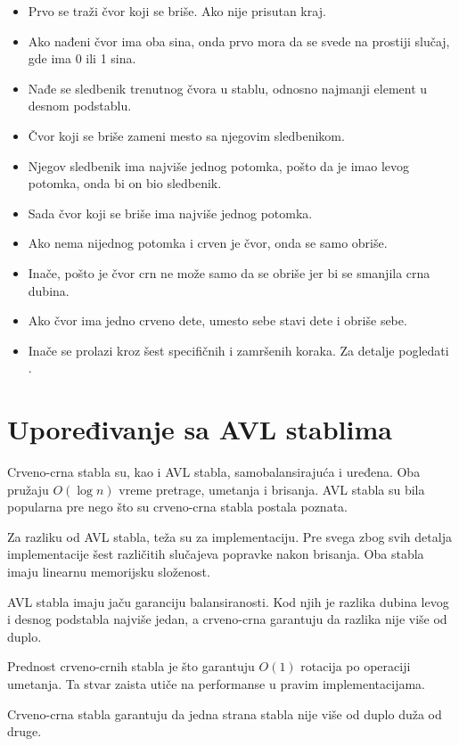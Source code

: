 \documentclass[a4paper]{article}
\begin{document}
\begin{itemize}
    \item Prvo se traži čvor koji se briše. Ako nije prisutan kraj.
    \item Ako nađeni čvor ima oba sina, onda prvo mora da se svede na prostiji slučaj, gde ima 0 ili 1 sina.
    \item Nađe se sledbenik trenutnog čvora u stablu, odnosno najmanji element u desnom podstablu.
    \item Čvor koji se briše zameni mesto sa njegovim sledbenikom.
    \item Njegov sledbenik ima najviše jednog potomka, pošto da je imao levog potomka, onda bi on bio sledbenik.
    \item Sada čvor koji se briše ima najviše jednog potomka. 
    \item Ako nema nijednog potomka i crven je čvor, onda se samo obriše.
    \item Inače, pošto je čvor crn ne može samo da se obriše jer bi se smanjila crna dubina.
    \item Ako čvor ima jedno crveno dete, umesto sebe stavi dete i obriše sebe.
    \item Inače se prolazi kroz šest specifičnih i zamršenih koraka. Za detalje pogledati \cite{cases} \cite{clrs}.
\end{itemize}

\section{Upoređivanje sa AVL stablima}
    Crveno-crna stabla su, kao i AVL stabla, samobalansirajuća i uređena. Oba pružaju $O(\log n)$ vreme pretrage, umetanja i brisanja.
    AVL stabla su bila popularna pre nego što su crveno-crna stabla postala poznata.

    Za razliku od AVL stabla, teža su za implementaciju. Pre svega zbog svih detalja implementacije šest različitih slučajeva 
    popravke nakon brisanja.
    Oba stabla imaju linearnu memorijsku složenost.

    AVL stabla imaju jaču garanciju balansiranosti. Kod njih je razlika dubina levog i desnog podstabla najviše jedan, a crveno-crna garantuju da razlika nije više od duplo.

    Prednost crveno-crnih stabla je što garantuju $O(1)$ rotacija po operaciji umetanja. 
    Ta stvar zaista utiče na performanse u pravim implementacijama.

    Crveno-crna stabla garantuju da jedna strana stabla nije više od duplo duža od druge.
\end{document}
